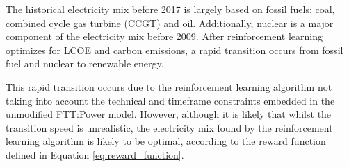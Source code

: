 \documentclass{article}
\begin{document}
The historical electricity mix before 2017 is largely based on fossil fuels: coal, combined cycle gas turbine (CCGT) and oil. Additionally, nuclear is a major component of the electricity mix before 2009. After reinforcement learning optimizes for LCOE and carbon emissions, a rapid transition occurs from fossil fuel and nuclear to renewable energy. 

This rapid transition occurs due to the reinforcement learning algorithm not taking into account the technical and timeframe constraints embedded in the unmodified FTT:Power model. However, although it is likely that whilst the transition speed is unrealistic, the electricity mix found by the reinforcement learning algorithm is likely to be optimal, according to the reward function defined in Equation \ref{eq:reward_function}.



\end{document}
